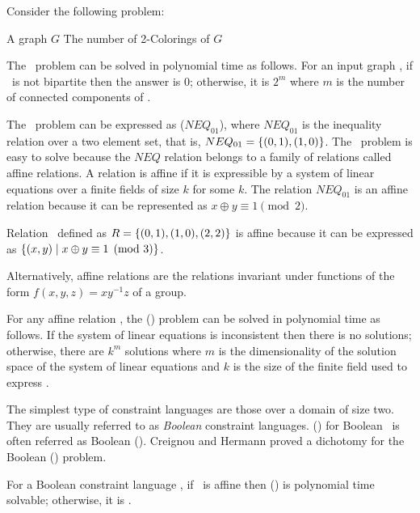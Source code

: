 Consider the following problem:

\pdef{\cdcol}
{A graph \(G\)}
{The number of 2-Colorings of \(G\)}

The \cdcol\ problem can be solved in polynomial time as follows.
For an input graph \mG, if \mG\ is not bipartite then the answer is \(0\); otherwise,
it is \(2^m\) where \(m\) is the number of connected components of \mG\@.

The \cdcol\ problem can be expressed as \ccsp(\(NEQ_{01}\)), where
\(NEQ_{01}\) is the inequality relation over a two element set, that is,
\(NEQ_{01}=\{{(0,1),(1,0)}\}\)\@. 
The \cdcol\ problem is easy to solve because
the \(NEQ\) relation belongs to a family of relations called affine relations.
A relation is affine if it is expressible by a system of linear equations over a
finite fields  of size \(k\) for some \(k\)\@. The relation \(NEQ_{01}\) is an 
affine relation because it can be represented as \(x\oplus y \equiv 1 \pmod{2}\)\@.

\begin{example}
Relation \mR\ defined as \(R=\{{(0,1),(1,0),(2,2)}\}\) is affine because it can be expressed as 
\(\{{(x,y)\mid x \oplus y \equiv 1 \pmod{3}}\}\)\@.
\end{example}

Alternatively, affine relations are the relations invariant under functions of the form
\(f(x,y,z)=xy^{-1}z\) of a group.

For any affine relation \mR, the \ccsp(\mR) problem can be solved in polynomial time
as follows. If the system of linear equations is inconsistent
then there is no solutions; otherwise, there are \(k^m\) solutions where \(m\) is the
dimensionality of the solution space of the system of linear equations and
\(k\) is the size of the finite field used to express \mR\@.

The simplest type of constraint languages are those 
over a domain of size two. They are usually 
referred to as \emph{Boolean} constraint languages.
\ccsp(\mrelset) for Boolean \mrelset\ is often referred as Boolean \ccsp(\mrelset)\@.
Creignou and Hermann proved a dichotomy for the Boolean \ccsp(\mrelset) problem.

\begin{theorem}  
For a Boolean constraint language \mrelset,
if  \mrelset\ is affine then \ccsp(\mrelset) 
is polynomial time solvable; otherwise, it is \cpc\@.
\end{theorem}

